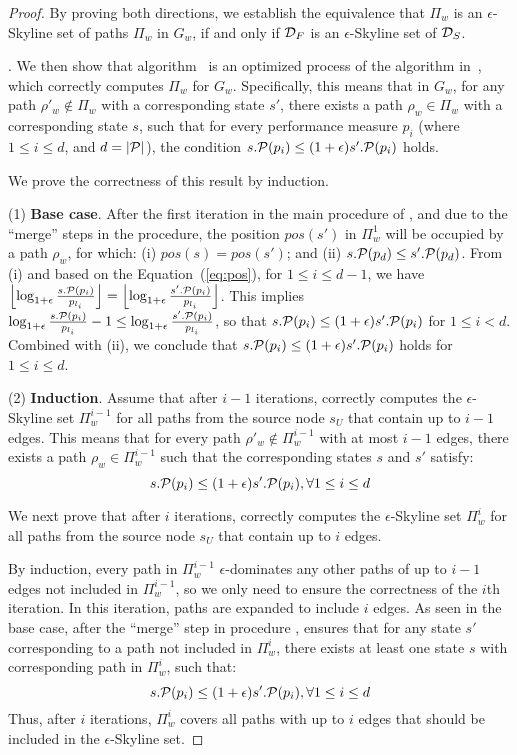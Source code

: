 \begin{proof}
By proving both directions, we establish the equivalence that $\Pi_w$ is an $\epsilon$-Skyline set 
of paths $\Pi_w$ in $G_w$, if and only 
if $\D_F$ is an $\epsilon$-Skyline set 
of $\D_S$.

. 
We then show that 
algorithm~\apxmodis 
is an optimized process of 
the algorithm in~\cite{tsaggouris2009multiobjective}, 
which correctly computes 
$\Pi_w$ for $G_w$.
Specifically, this means that in $G_w$, for any path $\rho'_w \notin \Pi_w$ with a corresponding state $s'$, there exists a path $\rho_w \in \Pi_w$ with a corresponding state $s$, such that for every performance measure $p_i$ (where $1\leq i \leq d$, and $d=|\P|$), the condition $s.\P(p_i) \leq (1+\epsilon)s'.\P(p_i)$ holds.

We prove the correctness of this result by induction.

\sstab
(1) \textbf{Base case}.
After the first iteration in the main procedure of \apxmodis, and due to the ``merge'' steps in the \upi procedure, the position $pos(s')$ in $\Pi^1_w$ will be occupied by a path $\rho_w$, for which: (i) $pos(s) = pos(s')$; and (ii) $s.\P(p_d) \leq s'.\P(p_d)$. From (i) and based on the Equation~(\ref{eq:pos}), for $1\leq i \leq d-1$, we have $\left\lfloor\log _{1+\epsilon} \frac{s.\P(p_i)}{p_{l_i}}\right\rfloor = \left\lfloor\log _{1+\epsilon} \frac{s'.\P(p_i)}{p_{l_i}}\right\rfloor$. This implies $\log _{1+\epsilon} \frac{s.\P(p_i)}{p_{l_i}} - 1 \leq \log _{1+\epsilon} \frac{s'.\P(p_i)}{p_{l_i}}$, so that $s.\P(p_i) \leq (1+\epsilon)s'.\P(p_i)$ for $1\leq i < d$. Combined with (ii), we conclude that $s.\P(p_i) \leq (1+\epsilon)s'.\P(p_i)$ holds for $1\leq i \leq d$.

\sstab
(2) \textbf{Induction}. 
Assume that after $i-1$ iterations, \apxmodis correctly computes the $\epsilon$-Skyline set $\Pi^{i-1}_w$ for all paths from the source node $s_U$ that contain up to $i-1$ edges. This means that for every path $\rho'_w \notin \Pi^{i-1}_w$ with at most $i-1$ edges, there exists a path $\rho_w \in \Pi^{i-1}_w$ such that the corresponding states $s$ and $s'$ satisfy: 
$$s.\P(p_i) \leq (1+\epsilon)s'.\P(p_i), \forall 1\leq i \leq d$$

We next prove that after $i$ iterations,  \apxmodis correctly computes the $\epsilon$-Skyline set $\Pi^i_w$ for all paths from the source node $s_U$ that contain up to $i$ edges.

By induction, every path in $\Pi^{i-1}_w$ $\epsilon$-dominates any other paths of up to $i-1$ edges not included in $\Pi^{i-1}_w$, so we only need to ensure the correctness of the $i$th iteration. 
In this iteration, paths are expanded to include $i$ edges. As seen in the base case, after the ``merge'' step in procedure \upi, \apxmodis ensures that for any state $s'$ corresponding to a path not included in $\Pi^i_w$, there exists at least one state $s$ with corresponding path in $\Pi^i_w$, such that:
$$s.\P(p_i) \leq (1+\epsilon)s'.\P(p_i), \forall 1\leq i \leq d$$
Thus, after $i$ iterations, $\Pi^i_w$ covers all paths with up to $i$ edges that should be included in the $\epsilon$-Skyline set.


\end{proof}
